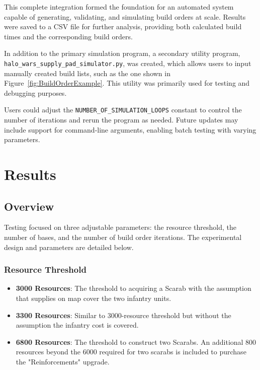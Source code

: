 \documentclass[a4paper, 12pt, english]{article}
\begin{document}
This complete integration formed the foundation for an automated system capable of generating, validating, and simulating build orders at scale. Results were saved to a CSV file for further analysis, providing both calculated build times and the corresponding build orders.
\newline

In addition to the primary simulation program, a secondary utility program, \texttt{halo\_wars\_supply\_pad\_simulator.py}, was created, which allows users to input manually created build lists, such as the one shown in Figure~\ref{fig:BuildOrderExample}. This utility was primarily used for testing and debugging purposes.
\newline

Users could adjust the \texttt{NUMBER\_OF\_SIMULATION\_LOOPS} constant to control the number of iterations and rerun the program as needed. Future updates may include support for command-line arguments, enabling batch testing with varying parameters.
\newline


\newpage
\section{Results}
\subsection{Overview}

Testing focused on three adjustable parameters: the resource threshold, the number of bases, and the number of build order iterations. The experimental design and parameters are detailed below.

\subsubsection{Resource Threshold}
    \begin{itemize}
    \item \textbf{3000 Resources}: The threshold to acquiring a Scarab with the assumption that supplies on map cover the two infantry units.
    \item \textbf{3300 Resources}: Similar to 3000-resource threshold but without the assumption the infantry cost is covered.
    \item \textbf{6800 Resources}: The threshold to construct two Scarabs. An additional 800 resources beyond the 6000 required for two scarabs is included to purchase the "Reinforcements" upgrade.
    \end{itemize}
\end{document}
